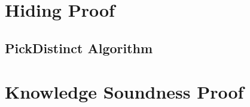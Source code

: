 \section{Hiding Proof}
\label{appendix:security:hiding}

\subsection*{PickDistinct Algorithm}
\label{appendix:security:hiding:picki}

\section{Knowledge Soundness Proof}
\label{appendix:security:knowledgesound}